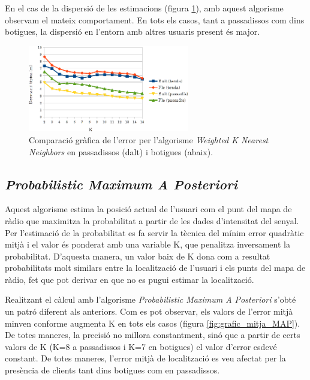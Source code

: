 En el cas de la dispersió de les estimacions (figura \ref{fig:grafic_desviacio_WKNN}), amb aquest algorisme observam el mateix comportament. En tots els casos, tant a passadissos com dins botigues, la dispersió en l'entorn amb altres usuaris present és major. 

\begin{figure}[ht]
\begin{center}
\includegraphics[width=7cm]{imatges/wknn_desviacio.png}
\caption{Comparació gràfica de l'error per l'algorisme \textit{Weighted K Nearest Neighbors} en passadissos (dalt) i botigues (abaix).}
\label{fig:grafic_desviacio_WKNN}
\end{center}
\end{figure}

\subsection{\textit{Probabilistic Maximum A Posteriori}}

Aquest algorisme estima la posició actual de l'usuari com el punt del mapa de ràdio que maximitza la probabilitat a partir de les dades d'intensitat del senyal. Per l'estimació de la probabilitat es fa servir la tècnica del mínim error quadràtic mitjà i el valor és ponderat amb una variable K, que penalitza inversament la probabilitat. D'aquesta manera, un valor baix de K dona com a resultat probabilitats molt similars entre la localització de l'usuari i els punts del mapa de ràdio, fet que pot derivar en que no es pugui estimar la localització.

Realitzant el càlcul amb l'algorisme \textit{Probabilistic Maximum A Posteriori} s'obté un patró diferent als anteriors. Com es pot observar, els valors de l'error mitjà minven conforme augmenta K en tots els casos (figura \ref{fig:grafic_mitja_MAP}). De totes maneres, la precisió no millora constantment, sinó que a partir de certs valors de K (K=8 a passadissos i K=7 en botigues) el valor d'error esdevé constant. De totes maneres, l'error mitjà de localització es veu afectat per la presència de clients tant dins botigues com en passadissos.

